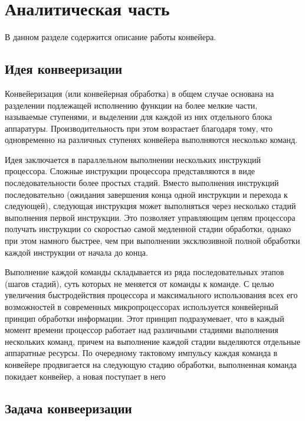 \documentclass[a4paper,12pt]{report}
\begin{document}
\chapter{Аналитическая часть}
\hspace{0.6cm}В данном разделе содержится описание работы конвейера.

\section{Идея конвееризации}
\hspace{0.6cm}Конвейеризация (или конвейерная обработка) в общем случае основана на разделении подлежащей исполнению функции на более мелкие части, называемые ступенями, и выделении для каждой из них отдельного блока аппаратуры. Производительность при этом возрастает благодаря тому, что одновременно на различных ступенях конвейера выполняются несколько команд.

Идея заключается в параллельном выполнении нескольких инструкций процессора. Сложные инструкции процессора представляются в виде последовательности более простых стадий. Вместо выполнения инструкций последовательно (ожидания завершения конца одной инструкции и перехода к следующей), следующая инструкция может выполняться через несколько стадий выполнения первой инструкции. Это позволяет управляющим цепям процессора получать инструкции со скоростью самой медленной стадии обработки, однако при этом намного быстрее, чем при выполнении эксклюзивной полной обработки каждой инструкции от начала до конца.

Выполнение каждой команды складывается из ряда последовательных этапов (шагов стадий), суть которых не меняется от команды к команде. С целью увеличения быстродействия процессора и максимального использования всех его возможностей в современных микропроцессорах используется конвейерный принцип обработки информации. Этот принцип подразумевает, что в каждый момент времени процессор работает над различными стадиями выполнения нескольких команд, причем на выполнение каждой стадии выделяются отдельные аппаратные ресурсы. По очередному тактовому импульсу каждая команда в конвейере продвигается на следующую стадию обработки, выполненная команда покидает конвейер, а новая поступает в него

\section{Задача конвееризации}
\end{document}
